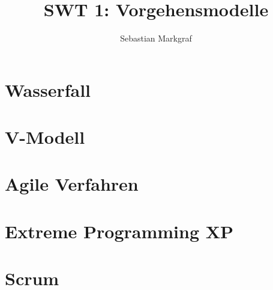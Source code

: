 \documentclass[a4paper]{article}
\title{SWT 1: Vorgehensmodelle}
\author{Sebastian Markgraf}
\theoremstyle{break}
\begin{document}
    \maketitle
    \tableofcontents
    \newpage

    \section{Wasserfall}
    \section{V-Modell}

    \section{Agile Verfahren}

    \section{Extreme Programming XP}

    \section{Scrum}
\end{document}
